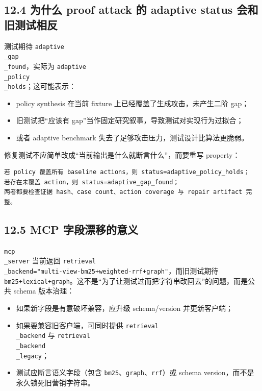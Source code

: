 \documentclass[UTF8,12pt,openany]{ctexbook}
\begin{document}
\subsection{12.4 为什么 proof attack 的 adaptive status 会和旧测试相反}

测试期待 \texttt{adaptive\\_gap\\_found}，实际为 \texttt{adaptive\\_policy\\_holds}；这可能表示：\par

\begin{itemize}
\item policy synthesis 在当前 fixture 上已经覆盖了生成攻击，未产生二阶 gap；
\item 旧测试把“应该有 gap”当作固定研究叙事，导致测试对实现行为过拟合；
\item 或者 adaptive benchmark 失去了足够攻击压力，测试设计比算法更脆弱。
\end{itemize}

修复测试不应简单改成“当前输出是什么就断言什么”，而要重写 property：\par

\begin{lstlisting}
若 policy 覆盖所有 baseline actions，则 status=adaptive_policy_holds；
若存在未覆盖 action，则 status=adaptive_gap_found；
两者都要检查证据 hash、case count、action coverage 与 repair artifact 完整。
\end{lstlisting}

\subsection{12.5 MCP 字段漂移的意义}

\texttt{mcp\\_server} 当前返回 \texttt{retrieval\\_backend="multi-view-bm25+weighted-rrf+graph"}，而旧测试期待 \texttt{bm25+lexical+graph}。这不是“为了让测试过而把字符串改回去”的问题，而是公共 schema 版本治理：\par

\begin{itemize}
\item 如果新字段是有意破坏兼容，应升级 schema/version 并更新客户端；
\item 如果要兼容旧客户端，可同时提供 \texttt{retrieval\\_backend} 与 \texttt{retrieval\\_backend\\_legacy}；
\item 测试应断言语义字段（包含 \texttt{bm25}、\texttt{graph}、\texttt{rrf}）或 schema version，而不是永久锁死旧营销字符串。
\end{itemize}
\end{document}
